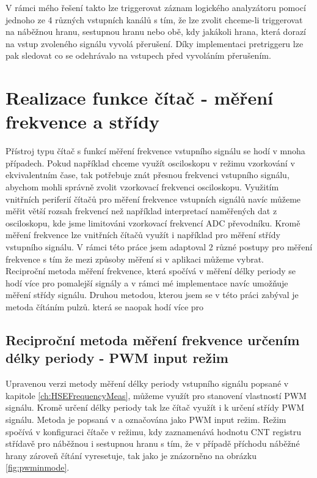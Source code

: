  V rámci mého řešení takto lze triggerovat záznam logického analyzátoru pomocí jednoho ze 4 různých vstupních kanálů s tím, že lze zvolit chceme-li triggerovat na náběžnou hranu, sestupnou hranu nebo obě, kdy jakákoli hrana, která dorazí na vstup zvoleného signálu vyvolá přerušení. Díky implementaci pretriggeru lze pak sledovat co se odehrávalo na vstupech před vyvoláním přerušením.
 
 \newpage
 \section{Realizace funkce čítač - měření frekvence a střídy}
 Přístroj typu čítač s funkcí měření frekvence vstupního signálu se hodí v mnoha případech. Pokud například chceme využít osciloskopu v režimu vzorkování v ekvivalentním čase, tak potřebuje znát přesnou frekvenci vstupního signálu, abychom mohli správně zvolit vzorkovací frekvenci osciloskopu. Využitím vnitřních periferií čítačů pro měření frekvence vstupních signálů navíc můžeme měřit větší rozsah frekvencí než například interpretací naměřených dat z osciloskopu, kde jsme limitováni vzorkovací frekvencí ADC převodníku. Kromě měření frekvence lze vnitřních čítačů využít i například pro měření střídy vstupního signálu. V rámci této práce jsem adaptoval 2 různé postupy pro měření frekvence s tím že mezi způsoby měření si v aplikaci můžeme vybrat.\\
 
 Reciproční metoda měření frekvence,  která spočívá v měření délky periody se hodí více pro pomalejší signály a v rámci mé implementace navíc umožňuje měření střídy signálu. Druhou metodou, kterou jsem se v této práci zabýval je metoda čítáním pulzů. která se naopak hodí více pro
 
 \subsection{Reciproční metoda měření frekvence určením délky periody - PWM input režim}
 Upravenou verzi metody měření délky periody vstupního signálu popsané v kapitole \ref{ch:HSEFrequencyMeas}, můžeme využít pro stanovení vlastností PWM signálu. Kromě určení délky periody  tak lze čítač využít i k určení střídy PWM signálu. Metoda je popsaná v \cite{refG4} a označována jako PWM input režim. Režim spočívá v konfiguraci čítače v režimu, kdy zaznamenává hodnotu CNT registru střídavě pro náběžnou i sestupnou hranu s tím, že v případě příchodu náběžné hrany zároveň čítání vyresetuje, tak jako je znázorněno na obrázku \ref{fig:pwminmode}.  
 
